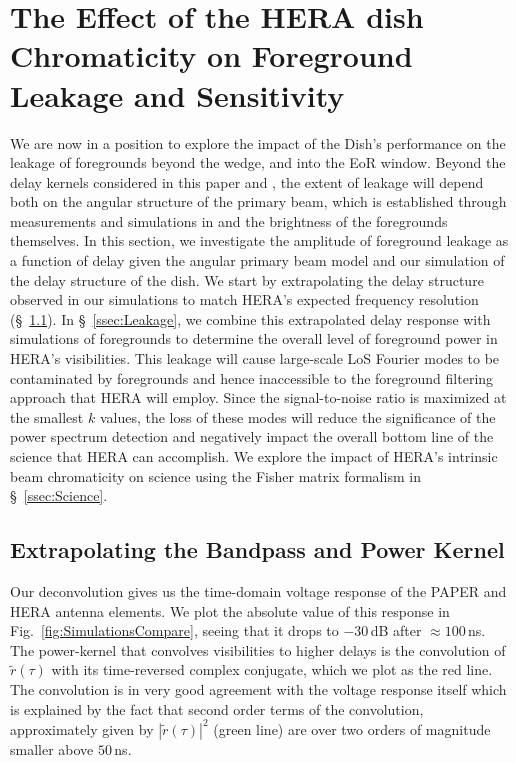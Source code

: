 \documentclass[twocolumn]{emulateapj}
\begin{document}
\section{The Effect of the HERA dish Chromaticity on Foreground Leakage and Sensitivity}\label{sec:Sensitivity}
We are now in a position to explore the impact of the Dish's performance on the leakage of foregrounds beyond the wedge, and into the EoR window. Beyond the delay kernels considered in this paper and \citep{Patra:2016}, the extent of leakage will depend both on the angular structure of the primary beam, which is established through measurements and simulations in \citep{Neben:2016} and the brightness of the foregrounds themselves. In this section, we investigate the amplitude of foreground leakage as a function of delay given the angular primary beam model and our simulation of the delay structure of the dish. We start by extrapolating the delay structure observed in our simulations to match HERA's expected frequency resolution (\S~\ref{ssec:Extrapolation}). In \S~\ref{ssec:Leakage}, we combine this extrapolated delay response with simulations of foregrounds to determine the overall level of foreground power in HERA's visibilities. This leakage will cause large-scale LoS Fourier modes to be contaminated by foregrounds and hence inaccessible to the foreground filtering approach that HERA will employ. Since the signal-to-noise ratio is maximized at the smallest $k$ values, the loss of these modes will reduce the significance of the power spectrum detection and negatively impact the overall bottom line of the science that HERA can accomplish. We explore the impact of HERA's intrinsic beam chromaticity on science using the Fisher matrix formalism in \S~\ref{ssec:Science}. 


\subsection{Extrapolating the Bandpass and Power Kernel}\label{ssec:Extrapolation}
Our deconvolution gives us the time-domain voltage response of the PAPER and HERA antenna elements. We plot the absolute value of this response in Fig.~\ref{fig:SimulationsCompare}, seeing that it drops to $-30$\,dB after $\approx 100$\,ns. The power-kernel that convolves visibilities to higher delays is the convolution of $\widetilde{r}(\tau)$ with its time-reversed complex conjugate, which we plot as the red line. The convolution is in very good agreement with the voltage response itself which is explained by the fact that second order terms of the convolution, approximately given by $|\widetilde{r}(\tau)|^2$ (green line) are over two orders of magnitude smaller above $50$\,ns.
\end{document}
